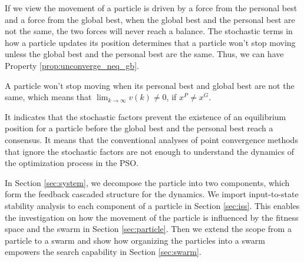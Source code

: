 If we view the movement of a particle is driven by a force from the personal best and a force from the global best, when the global best and the personal best are not the same, the two forces will never reach a balance.
The stochastic terms in how a particle updates its position determines that a particle won't stop moving unless the global best and the personal best are the same.
Thus, we can have Property \ref{prop:unconverge_neq_gb}.
\begin{myprop}
\label{prop:unconverge_neq_gb}
A particle won't stop moving when its personal best and global best are not the same, 
which means that 
$ \lim_{k \rightarrow \infty} v(k) \neq 0 $, if $ x^{P} \neq x^{G} $.
\end{myprop}
It indicates that the stochastic factors prevent the existence of an equilibrium position for a particle before the global best and the personal best reach a consensus.
It means that the conventional analyses of point convergence methods that ignore the stochastic factors are not enough to understand the dynamics of the optimization process in the PSO.

In Section \ref{sec:system}, we decompose the particle into two components, which form the feedback cascaded structure for the dynamics.
We import input-to-state stability analysis to each component of a particle in Section \ref{sec:iss}.
This enables the investigation on how the movement of the particle is influenced by the fitness space and the swarm in Section \ref{sec:particle}.
Then we extend the scope from a particle to a swarm and show how organizing the particles into a swarm empowers the search capability in Section \ref{sec:swarm}.

